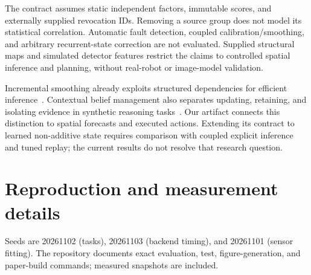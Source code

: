\documentclass{article}
\begin{document}
The contract assumes static independent factors, immutable scores, and externally supplied revocation IDs. Removing a source group does not model its statistical correlation. Automatic fault detection, coupled calibration/smoothing, and arbitrary recurrent-state correction are not evaluated. Supplied structural maps and simulated detector features restrict the claims to controlled spatial inference and planning, without real-robot or image-model validation.

Incremental smoothing already exploits structured dependencies for efficient inference~\cite{kaess2012isam2}. Contextual belief management also separates updating, retaining, and isolating evidence in synthetic reasoning tasks~\cite{xu2026cbm}. Our artifact connects this distinction to spatial forecasts and executed actions. Extending its contract to learned non-additive state requires comparison with coupled explicit inference and tuned replay; the current results do not resolve that research question.




\appendix
\section{Reproduction and measurement details}
Seeds are 20261102 (tasks), 20261103 (backend timing), and 20261101 (sensor fitting). The repository documents exact evaluation, test, figure-generation, and paper-build commands; measured snapshots are included.

\begin{center}
\begin{minipage}{\linewidth}
\makeatletter{}\makeatother
\centering\small

\vspace{7pt}
\caption{\textbf{Backend medians in milliseconds}, corresponding to Figure~\ref{fig:latency}. Ours denotes evidence-indexed retraction. All timings include revision, 20 forecasts, and global planning. Full samples and interquartile ranges are in \texttt{data/study.json}.}
\end{minipage}
\end{center}
\end{document}
